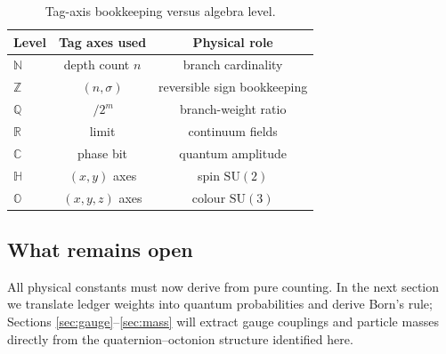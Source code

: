\begin{table}[b]
  \centering
  \begin{tabular}{lcc}
    \hline
    Level & Tag axes used & Physical role \\
    \hline
    $\mathbb N$ & depth count $n$ & branch cardinality \\[2pt]
    $\mathbb Z$ & $(n,\sigma)$ & reversible sign bookkeeping \\[2pt]
    $\mathbb Q$ & $\,/2^m$ & branch-weight ratio \\[2pt]
    $\mathbb R$ & limit & continuum fields \\[2pt]
    $\mathbb C$ & phase bit & quantum amplitude \\[2pt]
    $\mathbb H$ & $(x,y)$ axes & spin $\mathrm{SU}(2)$ \\[2pt]
    $\mathbb O$ & $(x,y,z)$ axes & colour $\mathrm{SU}(3)$ \\
    \hline
  \end{tabular}
  \caption{Tag-axis bookkeeping versus algebra level.}
  \label{tab:number-levels}
\end{table}

\subsection{What remains open}

All physical constants must now derive from pure counting.  In the next
section we translate ledger weights into quantum probabilities and derive
Born’s rule; Sections \ref{sec:gauge}–\ref{sec:mass} will extract gauge
couplings and particle masses directly from the quaternion–octonion
structure identified here.

\clearpage
